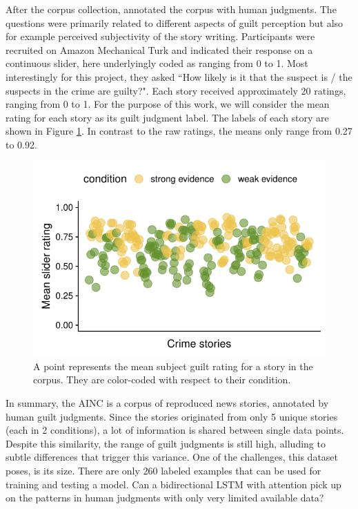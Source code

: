 \documentclass[11pt,a4paper]{article}
\begin{document}
After the corpus collection, \citeauthor{Kreiss:2019} annotated the corpus with human judgments. The questions were primarily related to different aspects of guilt perception but also for example perceived subjectivity of the story writing. Participants were recruited on Amazon Mechanical Turk and indicated their response on a continuous slider, here underlyingly coded as ranging from 0 to 1. Most interestingly for this project, they asked ``How likely is it that the suspect is / the suspects in the crime are guilty?". Each story received approximately 20 ratings, ranging from 0 to 1. For the purpose of this work, we will consider the mean rating for each story as its guilt judgment label. The labels of each story are shown in Figure \ref{fig:corpus-annotations}. In contrast to the raw ratings, the means only range from 0.27 to 0.92. 


\begin{figure}[t!]
	\includegraphics[width=\linewidth]{graphs/subjguilt.pdf}
	\caption{A point represents the mean subject guilt rating for a story in the corpus. They are color-coded with respect to their condition.}
	\label{fig:corpus-annotations}
\end{figure}

In summary, the AINC is a corpus of reproduced news stories, annotated by human guilt judgments. Since the stories originated from only 5 unique stories (each in 2 conditions), a lot of information is shared between single data points.  Despite this similarity, the range of guilt judgments is still high, alluding to subtle differences that trigger this variance. 
One of the challenges, this dataset poses, is its size. There are only 260 labeled examples that can be used for training and testing a model.
Can a bidirectional LSTM with attention pick up on the patterns in human judgments with only very limited available data?
\end{document}
